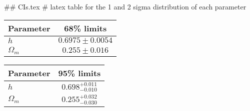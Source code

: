 ## CIs.tex
# latex table for the 1 and 2 sigma distribution of each parameter

\begin{tabular} { l  c}
 Parameter &  68\% limits\\
\hline
{\boldmath$h              $} & $0.6975\pm 0.0054          $\\
{\boldmath$\Omega_m       $} & $0.255\pm 0.016            $\\
\hline
\end{tabular}

\begin{tabular} { l  c}
 Parameter &  95\% limits\\
\hline
{\boldmath$h              $} & $0.698^{+0.011}_{-0.010}   $\\
{\boldmath$\Omega_m       $} & $0.255^{+0.032}_{-0.030}   $\\
\hline
\end{tabular}
